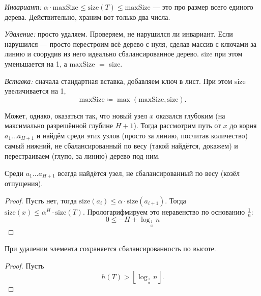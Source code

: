\documentclass[a4paper,11pt]{article}
\begin{document}
{\it Инвариант:} $\alpha \cdot \text{maxSize} \le \text{size} (T) \le \text{maxSize}$ — это про размер всего единого дерева. Действительно, храним вот только два числа.

{\it Удаление:} просто удаляем. Проверяем, не нарушился ли инвариант. Если нарушился — просто перестроим всё дерево с нуля, сделав массив с ключами за линию и соорудив из него идеально сбалансированное дерево. size при этом уменьшается на 1, а maxSize $=$ size.

{\it Вставка:} сначала стандартная вставка, добавляем ключ в лист. При этом size увеличивается на 1,
	$$\text{maxSize} \coloneqq \max (\text{maxSize},\text{size}).$$

Может, однако, оказаться так, что новый узел $x$ оказался глубоким (на максимально разрешённой глубине $H+1$). Тогда рассмотрим путь от $x$ до корня $a_1 \ldots a_{H+1}$ и найдём среди этих узлов (просто за линию, посчитав количество) самый нижний, не сбалансированный по весу (такой найдётся, докажем) и перестраиваем (глупо, за линию) дерево под ним.

\begin{theorem}
	Среди $a_1 \ldots a_{H+1}$ всегда найдётся узел, не сбалансированный по весу (козёл отпущения).
\end{theorem}

\begin{proof}
	Пусть нет, тогда $\text{size} (a_i) \le \alpha \cdot \text{size} (a_{i+1})$. Тогда $\text{size} (x) \le \alpha^H \cdot \text{size} (T)$. Прологарифмируем это неравенство по основанию $\frac{1}{n}$:
	$$0 \le -H + \log_{\frac{1}{\alpha}} n$$
\end{proof}

\begin{theorem}
	При удалении элемента сохраняется сбалансированность по высоте.
\end{theorem}

\begin{proof}
	Пусть
	$$h(T) > \left\lfloor \log_{\frac{1}{\alpha}} n \right\rfloor.$$
\end{proof}
\end{document}
